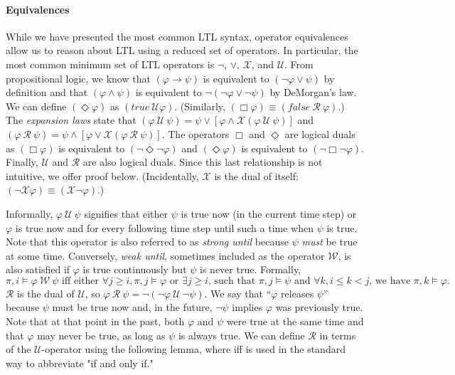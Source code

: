 \documentclass{elsarticle} %
\renewcommand{\phi}{\varphi}
\begin{document}
\paragraph{Equivalences} While we have presented the most common LTL syntax, operator equivalences allow us to reason about LTL using a reduced set of operators. In particular, the most common minimum set of LTL operators is $\neg$, $\vee$, $\mathcal{X}$, and $\mathcal{U}$. From propositional logic, we know that $(\phi \rightarrow \psi)$ is equivalent to $(\neg \phi \vee \psi)$ by definition and that $(\phi \wedge \psi)$ is equivalent to $\neg (\neg \phi \vee \neg \psi)$ by DeMorgan's law. We can define $(\Diamond \phi)$ as $(true \ \mathcal{U} \phi)$. (Similarly, $(\Box \phi) \equiv (false \ \mathcal{R} \ \phi)$.) The \emph{expansion laws} state that $(\phi \ \mathcal{U} \ \psi) = \psi \vee [ \phi \wedge \mathcal{X} ( \phi \ \mathcal{U} \ \psi) ]$ and $(\phi \ \mathcal{R} \ \psi) = \psi \wedge [ \phi \vee \mathcal{X} ( \phi \ \mathcal{R} \ \psi) ]$. The operators $\Box$ and $\Diamond$ are logical duals as $(\Box \phi)$ is equivalent to $(\neg \Diamond \neg \phi)$ and $(\Diamond \phi)$ is equivalent to $(\neg \Box \neg \phi)$. Finally, $\mathcal{U}$ and $\mathcal{R}$ are also logical duals. Since this last relationship is not intuitive, we offer proof below. (Incidentally, $\mathcal{X}$ is the dual of itself: $(\neg \mathcal{X} \phi) \equiv (\mathcal{X} \neg \phi)$.)  

Informally, $\phi \ \mathcal{U} \ \psi$ signifies that either $\psi$ is true now (in the current time step) or $\phi$ is true now and for every following time step until such a time when $\psi$ is true. Note that this operator is also referred to as \emph{strong until} because $\psi$ \emph{must} be true at some time. Conversely, \emph{weak until}, sometimes included as the operator $\mathcal{W}$, is also satisfied if $\phi$ is true continuously but $\psi$ is never true. Formally, 
\[\pi, i \vDash \phi \ \mathcal{W} \ \psi\mbox{ iff either }\forall j \ge i, \pi, j \vDash \phi \mbox{ or } \exists j \ge i\mbox{, such that }\pi, j \vDash \psi\mbox{ and }\forall k, i \le k < j\mbox{, we have } \pi, k \vDash \phi.\] 
$\mathcal{R}$ is the dual of $\mathcal{U}$, so $\phi \ \mathcal{R} \ \psi = \neg(\neg \phi \ \mathcal{U} \ \neg \psi)$. We say that ``$\phi$ releases $\psi$'' because $\psi$ must be true now and, in the future, 
$\neg \psi$ implies $\phi$ was previously true. 
Note that at that point in the past, both $\phi$ and $\psi$ were true at the same time and that $\phi$ may never be true, as long as $\psi$ is always true.
We can %
define $\mathcal{R}$ in terms of the $\mathcal{U}$-operator using the following lemma, where iff is used in the standard way to abbreviate "if and only if."
\end{document}
